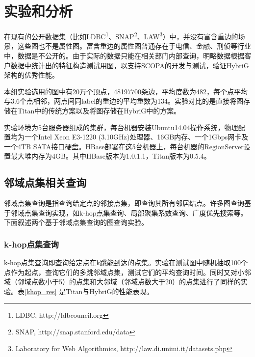
\chapter{实验和分析} \label{chap:experiments}
在现有的公开数据集（比如LDBC\footnote{LDBC, http://ldbcouncil.org}、SNAP\footnote{SNAP, http://snap.stanford.edu/data}、LAW\footnote{Laboratory for Web Algorithmics, http://law.di.unimi.it/datasets.php}）中，并没有富含重边的场景，这些图也不是属性图。富含重边的属性图普通存在于电信、金融、刑侦等行业中，数据是不公开的。由于实际的数据只能在相关部门内部查询，明略数据根据客户数据中统计出的特征构造测试用图，以支持SCOPA的开发与测试，验证HybriG架构的优秀性能。

本组实验选用的图中有20万个顶点，48197700条边，平均度数为482，每个点平均与3.6个点相邻，两点间同label的重边的平均重数为134。实验对比的是直接将图存储在Titan中的传统方案以及将图存储在HybriG中的方案。

实验环境为5台服务器组成的集群，每台机器安装Ubuntu14.04操作系统，物理配置均为一个Intel Xeon E3-1220 (3.10GHz)处理器、16GB内存、一个1Gbps网卡及一个4TB SATA接口硬盘。HBase部署在这5台机器上，每台机器的RegionServer设置最大堆内存为4GB。其中HBase版本为1.0.1.1，Titan版本为0.5.4。

\section{邻域点集相关查询}
邻域点集查询是指查询给定点的邻接点集，即查询其所有邻居结点。许多图查询基于邻域点集查询实现，如k-hop点集查询、局部聚集系数查询、广度优先搜索等。下面叙述两个基于邻域点集查询的图查询实验。
\subsection{k-hop点集查询}
k-hop点集查询即查询给定点在k跳能到达的点集。实验在测试图中随机抽取100个点作为起点，查询它们的多跳邻域点集，测试它们的平均查询时间。同时又对小邻域（邻域点数小于5）的点集和大邻域（邻域点数大于20）的点集进行了同样的实验。表\ref{khop_res} 是Titan与HybriG的性能表现。

